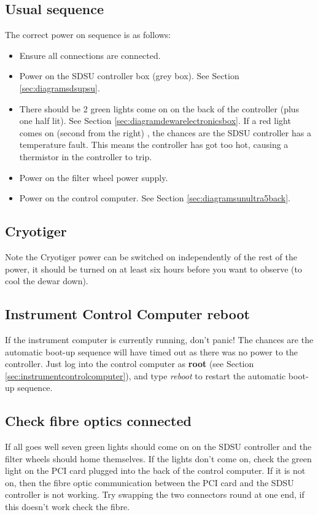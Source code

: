\documentclass[10pt,a4paper]{article}
\begin{document}
\subsection{Usual sequence}
The correct power on sequence is as follows:

\begin{itemize}
\item Ensure all connections are connected.
\item Power on the SDSU controller box (grey box). See Section \ref{sec:diagramsdsupsu}.
\item There should be 2 green lights come on on the back of the controller (plus one half lit). 
      See Section \ref{sec:diagramdewarelectronicsbox}.
      If a red light comes on (second from the right) , the chances are the SDSU controller has a temperature fault.
      This means the controller has got too hot, causing a thermistor in the controller to trip.
\item Power on the filter wheel power supply.
\item Power on the control computer. See Section \ref{sec:diagramsunultra5back}.
\end{itemize}

\subsection{Cryotiger}
Note the Cryotiger power can be switched on independently of the rest of the power, it should be turned on
at least six hours before you want to observe (to cool the dewar down).

\subsection{Instrument Control Computer reboot}
If the instrument computer is currently running, don't panic! The chances are the automatic boot-up sequence will have
timed out as there was no power to the controller. Just log into the control computer as {\bf root} 
(see Section \ref{sec:instrumentcontrolcomputer}), 
and type {\em reboot} to restart the automatic boot-up sequence.

\subsection{Check fibre optics connected}
If all goes well seven green lights should come on on the SDSU controller and the filter wheels should home themselves.
If the lights don't come on, check the green light on the PCI card plugged into the back of the control computer.
If it is not on, then the fibre optic communication between the PCI card and the SDSU controller is not working.
Try swapping the two connectors round at one end, if this doesn't work check the fibre.
\end{document}
